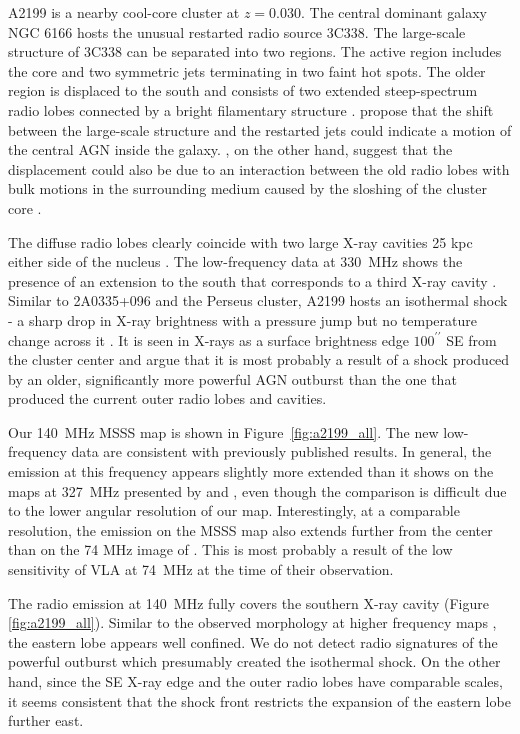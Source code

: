 \documentclass{aa}  %
\begin{document}
A2199 is a nearby cool-core cluster at $z=0.030$.   
The central dominant galaxy NGC 6166 hosts the unusual restarted radio source 3C338. 
The large-scale structure of 3C338 can be separated into two regions. The active region includes the core and two symmetric jets terminating in two faint hot spots. 
The older region is displaced to the south and consists of two extended steep-spectrum radio lobes connected by a bright filamentary structure \citep{Burns1983, Giovannini1998}. 
\cite{Burns1983} propose that the shift between the large-scale structure and the restarted jets could indicate a motion of the central AGN inside the galaxy. \cite{Vacca2012}, on the other hand, suggest that the displacement could also be due to an interaction between the old radio lobes with bulk motions in the surrounding medium caused by the sloshing of the cluster core \citep{Markevitch2007}.

The diffuse radio lobes clearly coincide with two large X-ray cavities 25 kpc either side of the nucleus \citep[e.g.][]{Johnstone2002, Gentile2007, Nulsen2013}. 
The low-frequency data at 330~MHz shows the presence of an extension to the south that corresponds to a third X-ray cavity \citep{Gentile2007}. 
Similar to 2A0335+096 and the Perseus cluster, A2199 hosts an isothermal shock - a sharp drop in X-ray brightness with a pressure jump but no temperature change across it \citep{SandersFabian2006}. It is seen in X-rays as a surface brightness edge $100^{\prime\prime}$ SE from the cluster center and \cite{Nulsen2013} argue that it is most probably a result of a shock produced by an older, significantly more powerful AGN outburst than the one that produced the current outer radio lobes and cavities.

Our 140~MHz MSSS map is shown in Figure~\ref{fig:a2199_all}. 
The new low-frequency data are consistent with previously published results.
In general, the emission at this frequency appears slightly more extended than it shows on the maps at 327~MHz presented by \cite{Gentile2007} and \cite{Birzan2008}, even though the comparison is difficult due to the lower angular resolution of our map.	
Interestingly, at a comparable resolution, the emission on the MSSS map also extends further from the center than on the 74 MHz image of \cite{Gentile2007}. 
This is most probably a result of the low sensitivity of VLA at 74~MHz at the time of their observation.

The radio emission at 140~MHz fully covers the southern X-ray cavity (Figure \ref{fig:a2199_all}).
Similar to the observed morphology at higher frequency maps \citep{Birzan2008, Gentile2007}, the eastern lobe appears well confined. %
We do not detect radio signatures of the powerful outburst which presumably created the isothermal shock.
On the other hand, since the SE X-ray edge and the outer radio lobes have comparable scales, it seems consistent that the shock front restricts the expansion of the eastern lobe further east.
\end{document}
